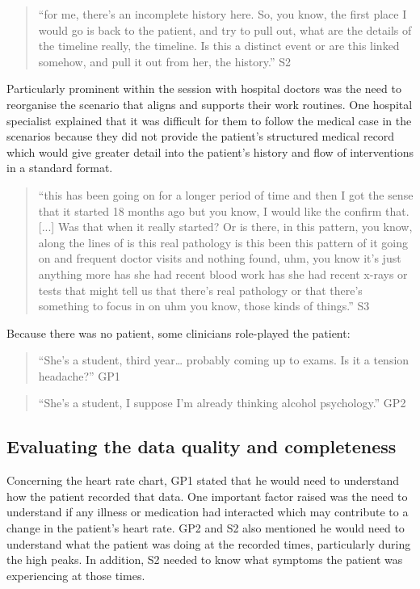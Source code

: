 \documentclass{sigchi}
\begin{document}
\begin{quote}
    ``for me, there's an incomplete history here. So, you know, the first place I would go is back to the patient, and try to pull out, what are the details of the timeline really, the timeline. Is this a distinct event or are this linked somehow, and pull it out from her, the history.'' S2
\end{quote}

Particularly prominent within the session with hospital doctors was the need to reorganise the scenario that aligns and supports their work routines. One hospital specialist explained that it was difficult for them to follow the medical case in the scenarios because they did not provide the patient’s structured medical record which would give greater detail into the patient’s history and flow of interventions in a standard format.

\begin{quote}
    ``this has been going on for a longer period of time and then I got the sense that it started 18 months ago but you know, I would like the confirm that. [...] Was that when it really started? Or is there, in this pattern, you know, along the lines of is this real pathology is this been this pattern of it going on and frequent doctor visits and nothing found, uhm, you know it’s just anything more has she had recent blood work has she had recent x-rays or tests that might tell us that there's real pathology or that there's something to focus in on uhm you know, those kinds of things.'' S3
\end{quote}

Because there was no patient, some clinicians role-played the patient:

\begin{quote}
    ``She's a student, third year… probably coming up to exams. Is it a tension headache?'' GP1
\end{quote}

\begin{quote}
    ``She's a student, I suppose I'm already thinking alcohol psychology.'' GP2
\end{quote}

\subsection{Evaluating the data quality and completeness}

Concerning the heart rate chart, GP1 stated that he would need to understand how the patient recorded that data. One important factor raised was the need to understand if any illness or medication had interacted which may contribute to a change in the patient’s heart rate. GP2 and S2 also mentioned he would need to understand what the patient was doing at the recorded times, particularly during the high peaks. In addition, S2 needed to know what symptoms the patient was experiencing at those times. 
\end{document}

